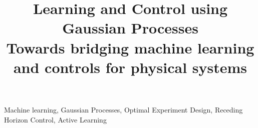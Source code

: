 \documentclass[conference]{IEEEtran}
\begin{document}
\title{Learning and Control using Gaussian Processes \\
	\vspace{0.1cm}
	\Large \textbf{Towards bridging machine learning and controls for physical systems}}


\author{
}

\maketitle



\begin{IEEEkeywords}
Machine learning, Gaussian Processes, Optimal Experiment Design, Receding Horizon Control, Active Learning
\end{IEEEkeywords}










%


 
\end{document}
